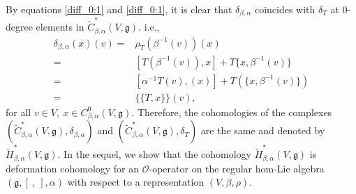 \documentclass[a4paper,11pt]{amsart}
\theoremstyle{plain}
\theoremstyle{definition}
\theoremstyle{remark}
\numberwithin{equation}{section}
\begin{document}
By equations \eqref{diff_0:1} and \eqref{diff_0:1}, it is clear that $\delta_{\beta,\alpha}$ coincides with $\delta_T$ at $0$-degree elements in $\widetilde{C}^*_{\beta,\alpha}(V,\mathfrak{g})$. i.e.,  
\begin{align*}
\delta_{\beta,\alpha}(x)(v)=&\rho_T(\beta^{-1}(v))(x)\\
=&[T(\beta^{-1}(v)),x]+T\{x,\beta^{-1}(v)\}\\
=& [\alpha^{-1}T(v),(x)] + T(\{x,\beta^{-1}(v)\})\\
=&\{\!\!\{T,x\}\!\!\}(v),
\end{align*}
for all $v\in V,~x\in C^0_{\beta,\alpha}(V,\mathfrak{g})$. Therefore, the cohomologies of the complexes $(\widetilde{C}^*_{\beta,\alpha}(V,\mathfrak{g}),\delta_{\beta,\alpha})$ and $(\widetilde{C}^*_{\beta,\alpha}(V,\mathfrak{g}),\delta_T)$ are the same and denoted by $\widetilde{H}^*_{\beta,\alpha}(V,\mathfrak{g})$. In the sequel, we show that the cohomology $\widetilde{H}^*_{\beta,\alpha}(V,\mathfrak{g})$ is deformation cohomology for an $\mathcal{O}$-operator on the regular hom-Lie algebra $(\mathfrak{g},[~,~],\alpha)$ with respect to a representation $(V,\beta,\rho)$. 
\end{document}
